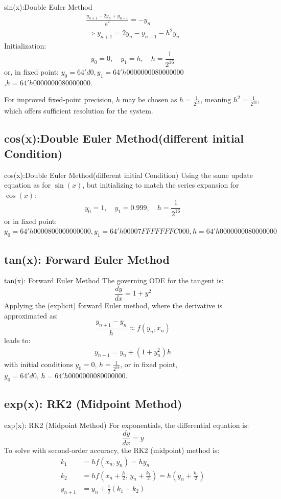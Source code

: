 \documentclass{beamer}
\theoremstyle{remark}
\begin{document}
\begin{frame}{sin(x):Double Euler Method}
    \begin{align*}
	\frac{y_{n+1} - 2y_n + y_{n-1}}{h^2} = -y_n \\
	\Rightarrow y_{n+1} = 2y_n - y_{n-1} - h^2 y_n
\end{align*}
Initialization: 
\[
y_0 = 0, \quad y_1 = h, \quad h = \frac{1}{2^{16}}
\]
or, in fixed point: $ y_0 = 64'd0, y_1 = 64'h0000000080000000$\\ 
,$h = 64'h0000000080000000 $.

For improved fixed-point precision, \(h\) may be chosen as \(h = \frac{1}{2^{15}}\), meaning \(h^2 = \frac{1}{2^{30}}\), which offers sufficient resolution for the system.
\end{frame}

\subsection{cos(x):Double Euler Method(different initial Condition)}
\begin{frame}{cos(x):Double Euler Method(different initial Condition)}
    Using the same update equation as for \(\sin(x)\), but initializing to match the series expansion for \(\cos(x)\):
\[
y_0 = 1, \quad y_1 = 0.999, \quad h = \frac{1}{2^{16}}
\]
or in fixed point:
$
y_0 = 64'h0000800000000000, y_1 = 64'h00007FFFFFFFC000, h = 64'h0000000080000000
$
\end{frame}

\subsection{tan(x): Forward Euler Method}
\begin{frame}{tan(x): Forward Euler Method}
    The governing ODE for the tangent is:
\[
\frac{dy}{dx} = 1 + y^2
\]
Applying the (explicit) forward Euler method, where the derivative is approximated as:
\[
\frac{y_{n+1} - y_n}{h} \approx f(y_n, x_n)
\]
leads to:
\begin{align*}
	y_{n+1} = y_n + (1 + y_n^2)h
\end{align*}
with initial conditions \( y_0 = 0,\, h = \frac{1}{2^{16}} \), or in fixed point, \( y_0 = 64'd0,\, h = 64'h0000000080000000 \).
\end{frame}

\subsection{exp(x): RK2 (Midpoint Method)}
\begin{frame}{exp(x): RK2 (Midpoint Method)}
For exponentials, the differential equation is:
\[
\frac{dy}{dx} = y
\]
To solve with second-order accuracy, the RK2 (midpoint) method is:
\begin{align*}
	k_1 &= h f(x_n, y_n) = h y_n \\
	k_2 &= h f\left(x_n + \frac{h}{2}, \, y_n + \frac{k_1}{2}\right) = h(y_n + \frac{k_1}{2}) \\
	y_{n+1} &= y_n + \frac{1}{2}(k_1 + k_2)
\end{align*}
\end{frame}
\end{document}
